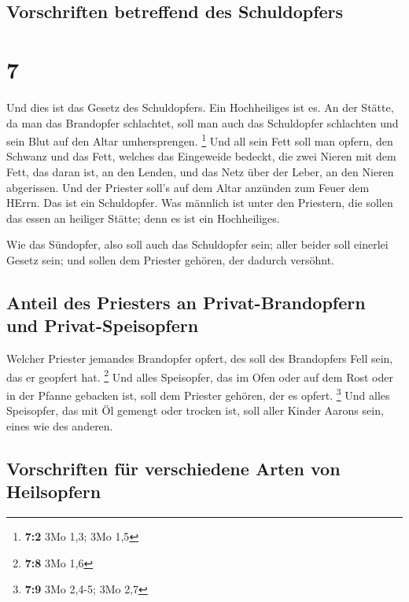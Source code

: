 \hypertarget{vorschriften-betreffend-des-schuldopfers}{%
\subsection{Vorschriften betreffend des
Schuldopfers}\label{vorschriften-betreffend-des-schuldopfers}}

\hypertarget{section-6}{%
\section{7}\label{section-6}}

 Und dies ist das Gesetz des Schuldopfers. Ein
Hochheiliges ist es.  An der Stätte, da man das Brandopfer
schlachtet, soll man auch das Schuldopfer schlachten und sein Blut auf
den Altar umhersprengen. \footnote{\textbf{7:2} 3Mo 1,3; 3Mo 1,5}
 Und all sein Fett soll man opfern, den Schwanz und das
Fett, welches das Eingeweide bedeckt,  die zwei Nieren mit
dem Fett, das daran ist, an den Lenden, und das Netz über der Leber, an
den Nieren abgerissen.  Und der Priester soll's auf dem
Altar anzünden zum Feuer dem HErrn. Das ist ein Schuldopfer.
 Was männlich ist unter den Priestern, die sollen das
essen an heiliger Stätte; denn es ist ein Hochheiliges.

 Wie das Sündopfer, also soll auch das Schuldopfer sein;
aller beider soll einerlei Gesetz sein; und sollen dem Priester gehören,
der dadurch versöhnt.

\hypertarget{anteil-des-priesters-an-privat-brandopfern-und-privat-speisopfern}{%
\subsection{Anteil des Priesters an Privat-Brandopfern und
Privat-Speisopfern}\label{anteil-des-priesters-an-privat-brandopfern-und-privat-speisopfern}}

 Welcher Priester jemandes Brandopfer opfert, des soll des
Brandopfers Fell sein, das er geopfert hat. \footnote{\textbf{7:8} 3Mo
  1,6}  Und alles Speisopfer, das im Ofen oder auf dem
Rost oder in der Pfanne gebacken ist, soll dem Priester gehören, der es
opfert. \footnote{\textbf{7:9} 3Mo 2,4-5; 3Mo 2,7}  Und
alles Speisopfer, das mit Öl gemengt oder trocken ist, soll aller Kinder
Aarons sein, eines wie des anderen.

\hypertarget{vorschriften-fuxfcr-verschiedene-arten-von-heilsopfern}{%
\subsection{Vorschriften für verschiedene Arten von
Heilsopfern}\label{vorschriften-fuxfcr-verschiedene-arten-von-heilsopfern}}

